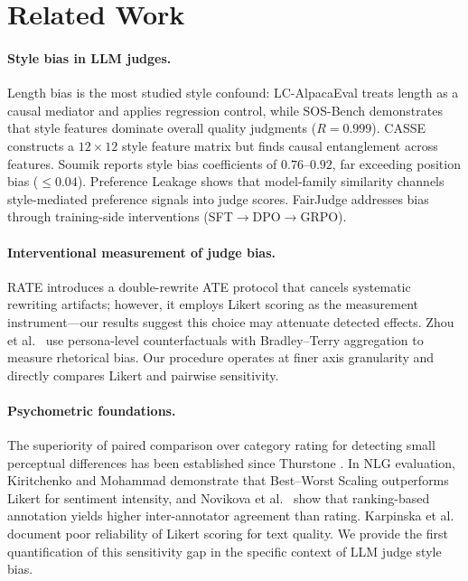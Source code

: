 \documentclass[11pt]{article}
\begin{document}
\section{Related Work}

\paragraph{Style bias in LLM judges.}
Length bias is the most studied style confound: LC-AlpacaEval \cite{dubois2024lengthcontrolled} treats length as a causal mediator and applies regression control, while SOS-Bench \cite{park2024sosbench} demonstrates that style features dominate overall quality judgments ($R = 0.999$).
CASSE \cite{wu2026casse} constructs a $12 \times 12$ style feature matrix but finds causal entanglement across features.
Soumik \cite{soumik2026judging} reports style bias coefficients of $0.76$--$0.92$, far exceeding position bias ($\leq 0.04$).
Preference Leakage \cite{li2026preferenceleakage} shows that model-family similarity channels style-mediated preference signals into judge scores.
FairJudge \cite{wang2026fairjudge} addresses bias through training-side interventions (SFT$\to$DPO$\to$GRPO).

\paragraph{Interventional measurement of judge bias.}
RATE \cite{feuer2025rate} introduces a double-rewrite ATE protocol that cancels systematic rewriting artifacts; however, it employs Likert scoring as the measurement instrument---our results suggest this choice may attenuate detected effects.
Zhou et al.\ \cite{zhou2025counterfactual} use persona-level counterfactuals with Bradley--Terry aggregation to measure rhetorical bias.
Our procedure operates at finer axis granularity and directly compares Likert and pairwise sensitivity.

\paragraph{Psychometric foundations.}
The superiority of paired comparison over category rating for detecting small perceptual differences has been established since Thurstone \cite{thurstone1927law}.
In NLG evaluation, Kiritchenko and Mohammad \cite{kiritchenko2017bestworstscaling} demonstrate that Best--Worst Scaling outperforms Likert for sentiment intensity, and Novikova et al.\ \cite{novikova2018rankme} show that ranking-based annotation yields higher inter-annotator agreement than rating.
Karpinska et al.\ \cite{karpinska2021perils} document poor reliability of Likert scoring for text quality.
We provide the first quantification of this sensitivity gap in the specific context of LLM judge style bias.
\end{document}
